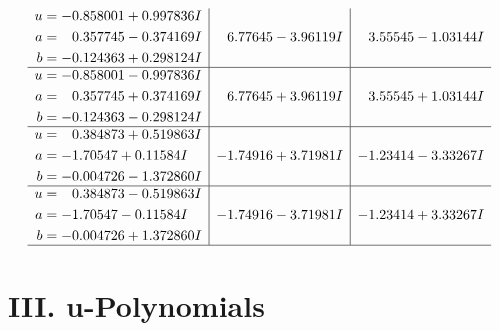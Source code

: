 \documentclass[1p]{elsarticle_modified}
\theoremstyle{definition}
\begin{document}
$$\begin{array}{c|c|c}
\begin{aligned}
u &= -0.858001 + 0.997836 I \\
a &= \phantom{-}0.357745 - 0.374169 I \\
b &= -0.124363 + 0.298124 I\end{aligned}
 & \phantom{-}6.77645 - 3.96119 I & \phantom{-}3.55545 - 1.03144 I \\ \hline\begin{aligned}
u &= -0.858001 - 0.997836 I \\
a &= \phantom{-}0.357745 + 0.374169 I \\
b &= -0.124363 - 0.298124 I\end{aligned}
 & \phantom{-}6.77645 + 3.96119 I & \phantom{-}3.55545 + 1.03144 I \\ \hline\begin{aligned}
u &= \phantom{-}0.384873 + 0.519863 I \\
a &= -1.70547 + 0.11584 I \\
b &= -0.004726 - 1.372860 I\end{aligned}
 & -1.74916 + 3.71981 I & -1.23414 - 3.33267 I \\ \hline\begin{aligned}
u &= \phantom{-}0.384873 - 0.519863 I \\
a &= -1.70547 - 0.11584 I \\
b &= -0.004726 + 1.372860 I\end{aligned}
 & -1.74916 - 3.71981 I & -1.23414 + 3.33267 I\\
 \hline 
 \end{array}$$\newpage
\newpage\renewcommand{\arraystretch}{1}
\centering \section*{ III. u-Polynomials}
\end{document}
